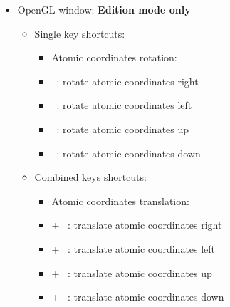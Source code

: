 {\begin{itemize}
\begin{itemize}
\begin{itemize}
\item Camera motion: \\
\item[] \Ctrl + \RArrow\ : move camera right
\item[] \Ctrl + \LArrow\ : move camera left
\item[] \Ctrl + \UArrow\ : move camera up
\item[] \Ctrl + \DArrow\ : move camera down \\
\item Spinning: \\
\item[] \Ctrl + \Shift + \RArrow\ : spin right / increase speed r. or reduce speed left
\item[] \Ctrl + \Shift + \RArrow\ : spin left / increase speed left or reduce speed right
\item[] \Ctrl + \Shift + \UArrow\ : spin up / increase speed up or reduce speed down
\item[] \Ctrl + \Shift + \DArrow\ : spin down / increase speed d. or reduce speed up \\
\item[] \Ctrl +  : stop spinning \\
\end{itemize}
\end{itemize}
\item OpenGL window: {\bf{Edition mode only}}
\begin{itemize}
\item Single key shortcuts: \\
\begin{itemize}
\item Atomic coordinates rotation: \\
\item[] \RArrow\ : rotate atomic coordinates right
\item[] \LArrow\ : rotate atomic coordinates left
\item[] \UArrow\ : rotate atomic coordinates up
\item[] \DArrow\ : rotate atomic coordinates down \\
\end{itemize}
\item Combined keys shortcuts: \\
\begin{itemize}
\item Atomic coordinates translation: \\
\item[] \Ctrl + \RArrow\ : translate atomic coordinates right
\item[] \Ctrl + \LArrow\ : translate atomic coordinates left
\item[] \Ctrl + \UArrow\ : translate atomic coordinates up
\item[] \Ctrl + \DArrow\ : translate atomic coordinates down
\end{itemize}
\end{itemize}
\end{itemize}}
